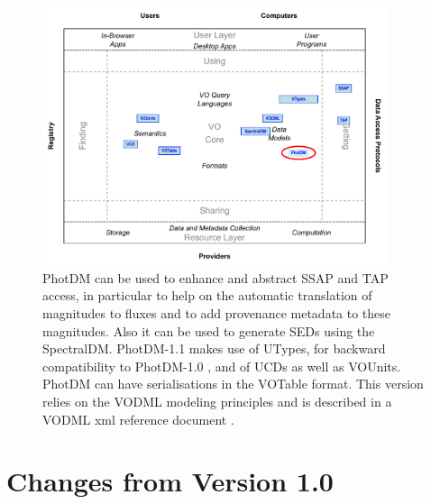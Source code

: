 \documentclass[11pt,a4paper]{ivoa}
\begin{document}
\begin{figure}[H]
\centering


\includegraphics[width=0.9\textwidth]{role_diagram.pdf}
\caption{PhotDM can be used to enhance and abstract SSAP and TAP access, in particular
to help on the automatic translation of magnitudes to fluxes and to add provenance
metadata to these magnitudes. Also it can be used to generate SEDs using the SpectralDM.
PhotDM-1.1 makes use of UTypes, for backward compatibility to PhotDM-1.0 , and of UCDs as well as VOUnits.
PhotDM can have  serialisations in the VOTable format. This version relies on the VODML modeling principles and
is described in a VODML xml reference document .}
\label{fig:archdiag}
\end{figure}

\section*{Changes from Version 1.0} \label{changesTable}

\end{document}
